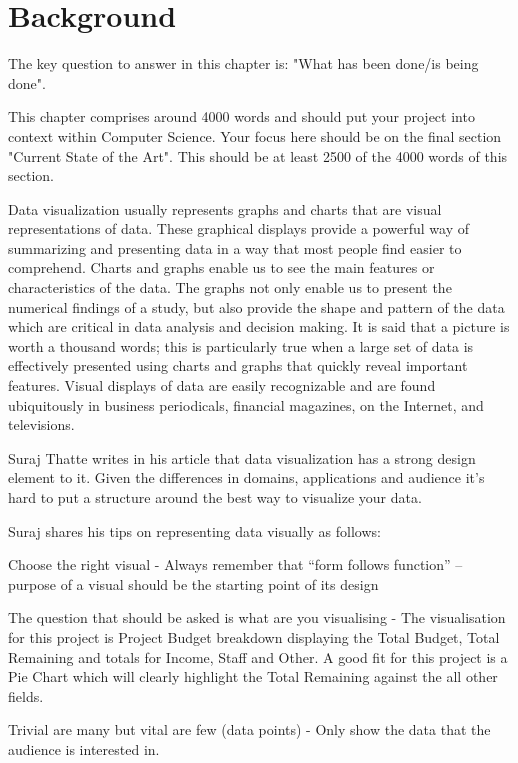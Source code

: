 \chapter{Background}
\label{chap:background}
The key question to answer in this chapter is: "What has been done/is being done". 

This chapter comprises around 4000 words and should put your project into context within Computer Science. Your focus here should be on the final section "Current State of the Art". This should be at least 2500 of the 4000 words of this section.

Data visualization usually represents graphs and charts that are visual representations of data. These graphical displays provide a powerful way of summarizing and presenting data in a way that most people find easier to comprehend. Charts and graphs enable us to see the main features or characteristics of the data. The graphs not only enable us to present the numerical findings of a study, but also provide the shape and pattern of the data which are critical in data analysis and decision making. It is said that a picture is worth a thousand words; this is particularly true when a large set of data is effectively presented using charts and graphs that quickly reveal important features. Visual displays of data are easily recognizable and are found ubiquitously in business periodicals, financial magazines, on the Internet, and televisions. \cite{VisualizationOverview}

Suraj Thatte writes in his article that data visualization has a strong design element to it. Given the differences in domains, applications and audience it’s hard to put a structure around the best way to visualize your data. \cite{Thatte2019}

Suraj shares his tips on representing data visually as follows:

	Choose the right visual - Always remember that “form follows function” – purpose of a visual should be the starting point of its design
	
	The question that should be asked is what are you visualising - The visualisation for this project is Project Budget breakdown displaying the Total Budget, Total Remaining and totals for Income, Staff and Other. A good fit for this project is a Pie Chart which will clearly highlight the Total Remaining against the all other fields.

	Trivial are many but vital are few (data points) - Only show the data that the audience is interested in.


